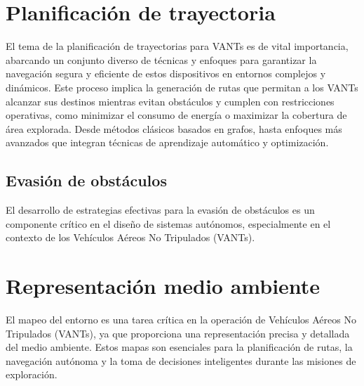 \section{Planificación de trayectoria}

El tema de la planificación de trayectorias para VANTs es de vital importancia, abarcando un conjunto diverso de técnicas y enfoques para garantizar la navegación segura y eficiente de estos dispositivos en entornos complejos y dinámicos. Este proceso implica la generación de rutas que permitan a los VANTs alcanzar sus destinos mientras evitan obstáculos y cumplen con restricciones operativas, como minimizar el consumo de energía o maximizar la cobertura de área explorada. Desde métodos clásicos basados en grafos, hasta enfoques más avanzados que integran técnicas de aprendizaje automático y optimización.

\subsection{Evasión de obstáculos}

El desarrollo de estrategias efectivas para la evasión de obstáculos es un componente crítico en el diseño de sistemas autónomos, especialmente en el contexto de los Vehículos Aéreos No Tripulados (VANTs). 

\section{Representación medio ambiente}

El mapeo del entorno es una tarea crítica en la operación de Vehículos Aéreos No Tripulados (VANTs), ya que proporciona una representación precisa y detallada del medio ambiente. Estos mapas son esenciales para la planificación de rutas, la navegación autónoma y la toma de decisiones inteligentes durante las misiones de exploración.


